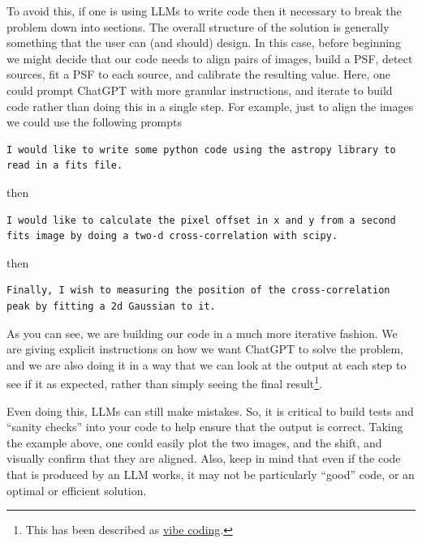 \documentclass{tufte-book}
\begin{document}
To avoid this, if one is using LLMs to write code then it necessary to break the problem down into sections. The overall structure of the solution is generally something that the user can (and should) design. In this case, before beginning we might decide that our code needs to align pairs of images, build a PSF, detect sources, fit a PSF to each source, and calibrate the resulting value. Here, one could prompt ChatGPT with more granular instructions, and iterate to build code rather than doing this in a single step. For example, just to align the images we could use the following prompts

\begin{lstlisting}[backgroundcolor=\color{lightgray},breaklines=true]
I would like to write some python code using the astropy library to read in a fits file.
\end{lstlisting}

then

\begin{lstlisting}[backgroundcolor=\color{lightgray}, breaklines=true]
I would like to calculate the pixel offset in x and y from a second fits image by doing a two-d cross-correlation with scipy.
\end{lstlisting}

then 

\begin{lstlisting}[backgroundcolor=\color{lightgray}, breaklines=true]
Finally, I wish to measuring the position of the cross-correlation peak by fitting a 2d Gaussian to it.
\end{lstlisting}

As you can see, we are building our code in a much more iterative fashion. We are giving explicit instructions on how we want ChatGPT to solve the problem, and we are also doing it in a way that we can look at the output at each step to see if it as expected, rather than simply 
seeing the final result\footnote{\raggedright{This has been described as \href{arstechnica.com/ai/2025/03/is-vibe-coding-with-ai-gnarly-or-reckless-maybe-some-of-both/}{vibe coding}.}}.

Even doing this, LLMs can still make mistakes. So, it is critical to build tests and ``sanity checks'' into your code to help ensure that the output is correct. Taking the example above, one could easily plot the two images, and the shift, and visually confirm that they are aligned. Also, keep in mind that even if the code that is produced by an LLM works, it may not be particularly ``good'' code, or an optimal or efficient solution.
\end{document}

